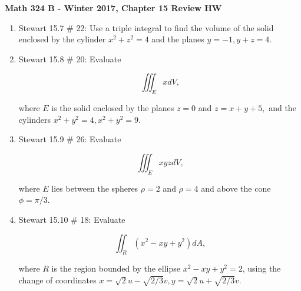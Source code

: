 \documentclass[11 pt]{report}
\begin{document}
\centerline{\bf Math 324 B - Winter 2017, Chapter 15 Review HW}

\begin{enumerate} \item Stewart 15.7 \# 22: Use a triple integral to find the volume of the solid enclosed by the cylinder $x^2+z^2 = 4$ and the planes $y = -1, y+z = 4$. 

\item Stewart 15.8 \# 20: Evaluate 

$$\iiint_E x dV,$$

where $E$ is the solid enclosed by the planes $z=0$ and $z = x+y+5,$ and the cylinders $x^2+y^2 = 4, x^2+y^2 = 9$. 

\item Stewart 15.9 \# 26: Evaluate 

$$\iiint_E xyz dV,$$

where $E$ lies between the spheres $\rho = 2$ and $\rho = 4$ and above the cone $\phi = \pi / 3$. 

\item Stewart 15.10 \# 18: Evaluate 

$$\iint_R (x^2 - xy + y^2) dA,$$

where $R$ is the region bounded by the ellipse $x^2 - xy + y^2 = 2$, using the change of coordinates $x = \sqrt{2} u - \sqrt{2/3} v, y = \sqrt{2}u + \sqrt{2/3} v.$

\end{enumerate}
\end{document}
